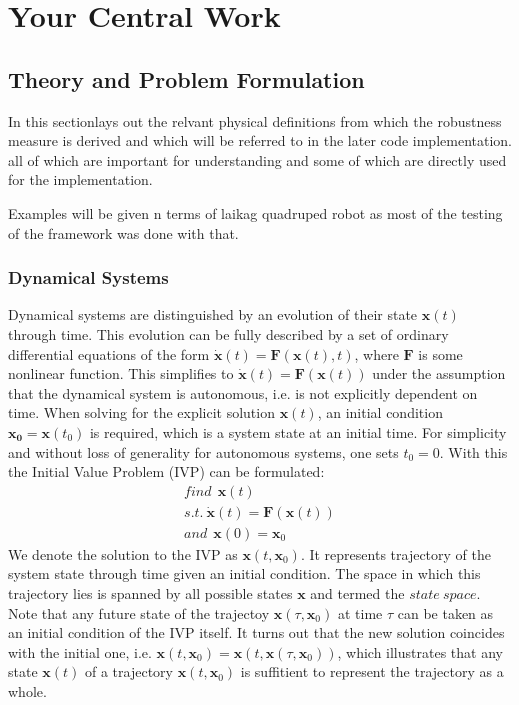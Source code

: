 \chapter{Your Central Work}

\section{Theory and Problem Formulation}

    In this sectionlays out the relvant physical definitions from which the robustness measure is derived and which will be referred to in the later code implementation. all of which are important for understanding and some of which are directly used for the implementation. 

    Examples will be given n terms of laikag quadruped robot as most of the testing of the framework was done with that. 

\subsection{Dynamical Systems} \label{dynamicstheory}
    
    Dynamical systems are distinguished by an evolution of their state $\mathbf{x}(t)$ through time. This evolution can be fully described by a set of ordinary differential equations of the form $\dot{\mathbf{x}}(t) = \mathbf{F}(\mathbf{x}(t),t)$, where $\mathbf{F}$ is some nonlinear function. This simplifies to $\dot{\mathbf{x}}(t) = \mathbf{F}(\mathbf{x}(t))$ under the assumption that the dynamical system is autonomous, i.e. is not explicitly dependent on time. 
    When solving for the explicit solution $\mathbf{x}(t)$, an initial condition $\mathbf{x_0}=\mathbf{x}(t_0)$ is required, which is a system state at an initial time. For simplicity and without loss of generality for autonomous systems, one sets $t_0 = 0$. With this the Initial Value Problem (IVP) can be formulated: \begin{gather} \label{eq:1} find \ \ \mathbf{x}(t) \\ s.t. \ \dot{\mathbf{x}}(t) = \mathbf{F}(\mathbf{x}(t)) \\ and \ \ \mathbf{x}(0) = \mathbf{x}_0 \end{gather}
    We denote the solution to the IVP as $\mathbf{x}(t,\mathbf{x}_0)$. It represents trajectory of the system state through time given an initial condition. The space in which this trajectory lies is spanned by all possible states $\mathbf{x}$ and termed the $state\ space$. Note that any future state of the trajectoy $\mathbf{x}(\tau,\mathbf{x}_0)$ at time $\tau$ can be taken as an initial condition of the IVP itself. It turns out that the new solution coincides with the initial one, i.e. $\mathbf{x}(t,\mathbf{x}_0) = \mathbf{x}(t,\mathbf{x}(\tau,\mathbf{x}_0))$, which illustrates that any state $\mathbf{x}(t)$ of a trajectory $\mathbf{x}(t,\mathbf{x}_0)$ is suffitient to represent the trajectory as a whole.
    
